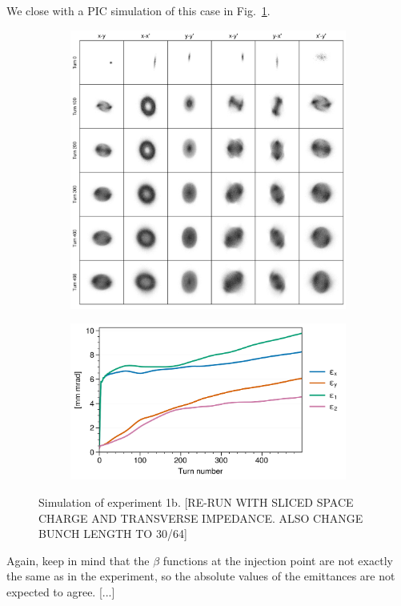 We close with a PIC simulation of this case in Fig.~\ref{fig:exp1b_sim}. 
%
\begin{figure}[!p]
    \centering
    \begin{subfigure}{0.85\textwidth}
        \includegraphics[width=\textwidth]{Images/chapter5/exp1b/sim_snapshots.png}
    \end{subfigure}
    \vfill
    \vspace*{1.0cm}
    \vfill
    \begin{subfigure}{0.7\textwidth}
        \includegraphics[width=\textwidth]{Images/chapter5/exp1b/sim_emittances.png}
    \end{subfigure}
    \caption{Simulation of experiment 1b. [RE-RUN WITH SLICED SPACE CHARGE AND TRANSVERSE IMPEDANCE. ALSO CHANGE BUNCH LENGTH TO 30/64]}
    \label{fig:exp1b_sim}
\end{figure}
%
Again, keep in mind that the $\beta$ functions at the injection point are not exactly the same as in the experiment, so the absolute values of the emittances are not expected to agree. [...]




